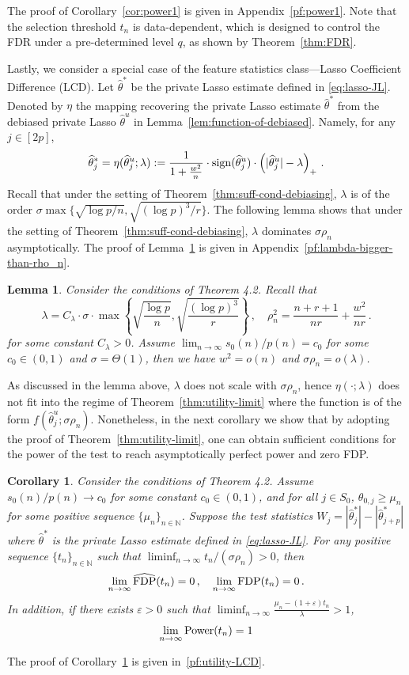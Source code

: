 \documentclass[11pt]{article}
\newtheorem{lemma}{Lemma}%
\newtheorem{corollary}{Corollary}%
\newcommand{\FDP}{{\rm FDP}}
\newcommand{\Power}{{\rm Power}}
\newcommand{\sign}{{\rm sign}}
\newcommand{\hth}{\widehat{\theta}}
\begin{document}
The proof of Corollary~\ref{cor:power1} is given in Appendix~\ref{pf:power1}. Note that the selection threshold $t_n$ is data-dependent, which is designed to control the FDR under a pre-determined level $q$, as shown by Theorem~\ref{thm:FDR}.

Lastly, we consider a special case of the feature statistics class---Lasso Coefficient Difference (LCD). Let $\hth^* $ be the private Lasso estimate defined in \eqref{eq:lasso-JL}. Denoted by $\eta$ the mapping recovering the private Lasso estimate $\hth^*$ from the debiased private Lasso $\hth^u$ in Lemma~\ref{lem:function-of-debiased}. Namely, for any $j\in[2p]$,
\[
\hth^*_j = \eta(\hth^u_j;\lambda):=\frac{1}{1+ \frac{w^2}{n}}\cdot\sign(\hth^u_j)\cdot\left(|\hth^u_j|-\lambda\right)_+\,.
\]
Recall that under the setting of Theorem~\ref{thm:suff-cond-debiasing}, $\lambda$ is of the order $\sigma\max\{\sqrt{\log p/n},\sqrt{(\log p)^3/r}\}$. The following lemma shows that under the setting of Theorem~\ref{thm:suff-cond-debiasing}, $\lambda$ dominates $\sigma\rho_n$ asymptotically. The proof of Lemma~\ref{lem:lambda-bigger-than-rho_n} is given in Appendix~\ref{pf:lambda-bigger-than-rho_n}.
\begin{lemma}\label{lem:lambda-bigger-than-rho_n}
    Consider the conditions of Theorem 4.2. Recall that 
    \[
    \lambda = C_\lambda\cdot\sigma\cdot\max\left\{\sqrt{\frac{\log p}{n}},\sqrt{\frac{(\log p)^3}{r}}\right\}\,,\quad\rho_n^2 = \frac{n+r+1}{n r}+\frac{w^2}{nr}\,.
    \]
    for some constant $C_\lambda>0$. Assume $ \lim_{n\to\infty}s_0(n)/p(n) = c_0$ for some $c_0\in(0,1)$ and $\sigma=\Theta(1)$, then we have $w^2=o(n)$ and $\sigma\rho_n=o(\lambda)$.
\end{lemma}
As discussed in the lemma above, $\lambda$ does not scale with $\sigma\rho_n$, hence $\eta(\cdot; \lambda)$ does not fit into the regime of Theorem~\ref{thm:utility-limit} where the function is of the form $f(\hth^u_j;\sigma\rho_n)$. Nonetheless, in the next corollary we show that by adopting the proof of Theorem~\ref{thm:utility-limit}, one can obtain sufficient conditions for the power of the test to reach asymptotically perfect power and zero FDP.

\begin{corollary}\label{cor:utility-LCD}
    Consider the conditions of Theorem 4.2. Assume $s_0(n)/p(n)\to c_0$ for some constant $c_0\in(0,1)$, and for all $j\in S_0$, $\theta_{0,j}\geq \mu_n$ for some positive sequence $\{\mu_n\}_{n\in\mathbb N}$. Suppose the test statistics $W_j = |\hth^*_j|-|\hth^*_{j+p}|$ where $\hth^*$ is the private Lasso estimate defined in \eqref{eq:lasso-JL}. For any positive sequence $\{t_n\}_{n\in\mathbb N}$ such that $\liminf_{n\to \infty} t_n/(\sigma\rho_n)>0$, then
    \begin{align*}
        \lim_{n\to\infty}\widehat \FDP(t_n)=0\,,\quad\lim_{n\to\infty}\FDP(t_n) = 0\,.
    \end{align*}
    In addition, if there exists $\varepsilon>0$ such that $ \liminf_{n\to\infty}\frac{\mu_n-(1+\varepsilon)t_n}{\lambda}>1$,
    \[
    \lim_{n\to\infty}\Power(t_n) = 1
    \]
\end{corollary}
The proof of Corollary~\ref{cor:utility-LCD} is given in~\ref{pf:utility-LCD}.
\end{document}
